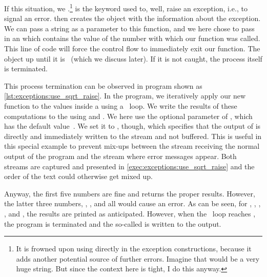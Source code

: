 If this situation, we .\footnote{%
It is frowned upon using  directly in the exception constructions, because it adds another potential source of further errors. %
Imagine that  would be a very huge string. %
But since the context here is tight, I do this anyway.}
 is the keyword used to, well, raise an exception, i.e., to signal an error.
 then creates the object with the information about the exception.
We can pass a string as a parameter to this function, and we here chose to pass in an  which contains the value of the number with which our  function was called.
This line of code will force the control flow to immediately exit our  function.
The  object  up until it is ~(which we discuss later).
If it is not caught, the process itself is terminated.

This process termination can be observed in program  shown as \cref{lst:exceptions:use_sqrt_raise}.
In the program, we iteratively apply our new  function to the values inside a  using a ~loop.
We write the results of these computations to the  using  and .
We here use the optional parameter  of , which has the default value~.
We set it to , though, which specifies that the output of  is directly and immediately written to the  stream and not buffered.
This is useful in this special example to prevent mix-ups between the  stream receiving the normal output of the program and the  stream where error messages appear.
Both streams are captured and presented in \cref{exec:exceptions:use_sqrt_raise} and the order of the text could otherwise get mixed up.

Anyway, the first five numbers are fine and  returns the proper results.
However, the latter three numbers, , , and  all would cause an error.
As can be seen, for , , , , and , the results are printed as anticipated.
However, when the ~loop reaches , the program is terminated and the so-called  is written to the output.

